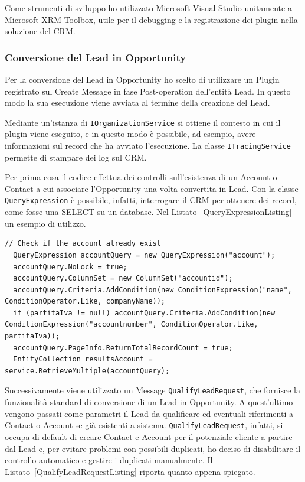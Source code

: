 Come strumenti di sviluppo ho utilizzato Microsoft Visual Studio unitamente a Microsoft XRM Toolbox, utile per il debugging e la registrazione dei plugin nella soluzione del CRM.

\subsubsection{Conversione del Lead in Opportunity}
\label{ssec:conversioneLead}
Per la conversione del Lead in Opportunity ho scelto di utilizzare un Plugin registrato sul Create Message in fase Post-operation dell'entità Lead. In questo modo la sua esecuzione viene avviata al termine della creazione del Lead.

Mediante un'istanza di \lstinline[language={[Sharp]C}]{IOrganizationService} si ottiene il contesto in cui il plugin viene eseguito, e in questo modo è possibile, ad esempio, avere informazioni sul record che ha avviato l'esecuzione. La classe \lstinline[language={[Sharp]C}]{ITracingService} permette di stampare dei log sul CRM. 

Per prima cosa il codice effettua dei controlli sull'esistenza di un Account o Contact a cui associare l'Opportunity una volta convertita in Lead. Con la classe \lstinline[language={[Sharp]C}]{QueryExpression} è possibile, infatti, interrogare il CRM per ottenere dei record, come fosse una SELECT su un database. Nel Listato~\ref{QueryExpressionListing} un esempio di utilizzo.

\begin{lstlisting}[language={[Sharp]C},breaklines=true,caption={Esempio di utilizzo di una QueryExpression.},label=QueryExpressionListing]
  // Check if the account already exist 
  QueryExpression accountQuery = new QueryExpression("account");
  accountQuery.NoLock = true;
  accountQuery.ColumnSet = new ColumnSet("accountid");
  accountQuery.Criteria.AddCondition(new ConditionExpression("name", ConditionOperator.Like, companyName));
  if (partitaIva != null) accountQuery.Criteria.AddCondition(new ConditionExpression("accountnumber", ConditionOperator.Like, partitaIva));
  accountQuery.PageInfo.ReturnTotalRecordCount = true;
  EntityCollection resultsAccount = service.RetrieveMultiple(accountQuery);
\end{lstlisting}

Successivamente viene utilizzato un Message \lstinline[language={[Sharp]C}]{QualifyLeadRequest}, che fornisce la funzionalità standard di conversione di un Lead in Opportunity. A quest'ultimo vengono passati come parametri il Lead da qualificare ed eventuali riferimenti a Contact o Account se già esistenti a sistema. \lstinline[language={[Sharp]C}]{QualifyLeadRequest}, infatti, si occupa di default di creare Contact e Account per il potenziale cliente a partire dal Lead e, per evitare problemi con possibili duplicati, ho deciso di disabilitare il controllo automatico e gestire i duplicati manualmente. Il Listato~\ref{QualifyLeadRequestListing} riporta quanto appena spiegato.

